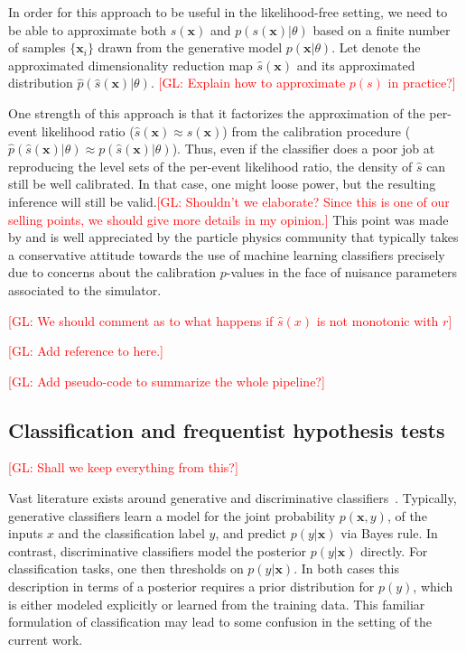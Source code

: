 \documentclass[12pt]{article}
\numberwithin{equation}{section}
\theoremstyle{plain}
\newcommand{\glnote}[1]{\textcolor{red}{[GL: #1]}}
\begin{document}
In order for this approach to be useful in the likelihood-free setting, we need
to be able to approximate both $s(\mathbf{x})$ and $p(s(\mathbf{x})|\theta)$
based on a finite number of samples $\{\mathbf{x}_i\}$ drawn from the generative
model $p(\mathbf{x}|\theta)$.
Let denote the approximated dimensionality
reduction map $\hat{s}(\mathbf{x})$ and its approximated distribution
$\hat{p}(\hat{s}(\mathbf{x})|\theta)$. \glnote{Explain how to approximate $p(s)$ in practice?}

One strength of this approach is that it factorizes the approximation of the
per-event likelihood ratio ($\hat{s}(\mathbf{x}) \approx s(\mathbf{x})$) from the
calibration procedure ($\hat p(\hat s(\mathbf{x})| \theta) \approx p(\hat{s}(\mathbf{x})|\theta)$).
Thus, even if the classifier does a poor job at reproducing the level sets of
the per-event likelihood ratio, the density of $\hat{s}$ can still be well
calibrated. In that case, one might loose power, but the resulting inference
will still be valid.\glnote{Shouldn't we elaborate? Since this is one of our selling points, we should give more details in my opinion.} This point was made by
\cite{Neal:2007zz} and is well appreciated by the particle physics community
that typically takes a conservative attitude towards the use of machine learning
classifiers precisely due to concerns about the calibration $p$-values in the
face of nuisance parameters associated to the simulator.

\glnote{We should comment as to what happens if $\hat{s}(x)$ is not monotonic with $r$}

\glnote{Add reference to \cite{BiancaZadrozny} here.}

\glnote{Add pseudo-code to summarize the whole pipeline?}

\subsection{Classification and frequentist hypothesis tests}

\glnote{Shall we keep everything from this?}

Vast literature exists around generative and discriminative
classifiers~\citep{AndrewY.Ng}. Typically, generative classifiers learn a model
for the joint probability $p(\mathbf{x}, y)$, of the inputs $x$ and the classification
label $y$, and predict $p(y|\mathbf{x})$ via Bayes rule. In contrast, discriminative
classifiers model the posterior $p(y|\mathbf{x})$ directly. For classification tasks, one
then thresholds on $p(y|\mathbf{x})$. In both cases this description in terms of a
posterior requires a prior distribution for $p(y)$, which is either modeled
explicitly or learned from the training data. This familiar formulation of
classification may lead to some confusion in the setting of the current work.
\end{document}
